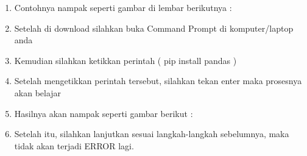 \begin{itemize}
\begin{enumerate}
\item Contohnya nampak seperti gambar di lembar berikutnya : 
\item Setelah di download silahkan buka Command Prompt di komputer/laptop anda 
\item Kemudian silahkan ketikkan perintah ( pip install pandas ) 
\item Setelah mengetikkan perintah tersebut, silahkan tekan enter maka prosesnya akan belajar 
\item Hasilnya akan nampak seperti gambar berikut : 
\item Setelah itu, silahkan lanjutkan sesuai langkah-langkah sebelumnya, maka tidak akan terjadi ERROR lagi. 
\end{enumerate}
\end{itemize}